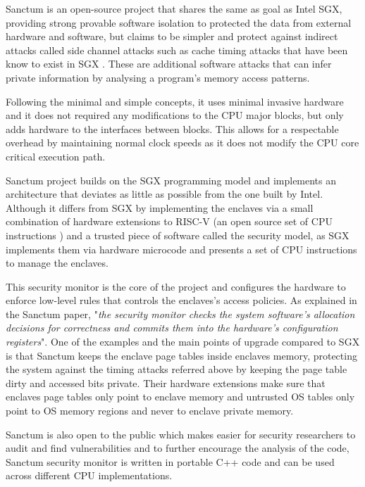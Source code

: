 Sanctum \cite{cryptoeprint:2015:564} is an open-source project that shares the same as goal as Intel \gls{SGX}, providing strong provable software isolation to protected the data from external hardware and software, but claims to be simpler and protect against indirect attacks called side channel attacks \cite{Khan2014} such as cache timing attacks \cite{cachetimingattaks:1} that have been know to exist in \gls{SGX} \cite{Gtzfried2017, 2017arXiv170208719S}. These are additional software attacks that can infer private information by analysing a program’s memory access patterns.

Following the minimal and simple concepts, it uses minimal invasive hardware and it does not required any modifications to the CPU major blocks, but only adds hardware to the interfaces between blocks. This allows for a respectable overhead by maintaining normal clock speeds as it does not modify the CPU core critical execution path.

Sanctum project builds on the \gls{SGX} programming model and implements an architecture that deviates as little as possible from the one built by Intel. Although it differs from \gls{SGX} by implementing the enclaves via a small combination of hardware extensions to RISC-V (an open source set of CPU instructions \cite{Waterman14therisc-v}) and a trusted piece of software called the security model, as SGX implements them via hardware microcode and presents a set of CPU instructions to manage the enclaves.

This security monitor is the core of the project and configures the hardware to enforce low-level rules that controls the enclaves's access policies. As explained in the Sanctum paper, "\textit{the security monitor checks the system software’s allocation decisions for correctness and commits them into the hardware’s configuration registers}". One of the examples and the main points of upgrade compared to \gls{SGX} is that Sanctum keeps the enclave page tables inside enclaves memory, protecting the system against the timing attacks referred above by keeping the page table dirty and accessed bits private. Their hardware extensions make sure that enclaves page tables only point to enclave memory and untrusted \gls{OS} tables only point to \gls{OS} memory regions and never to enclave private memory.

Sanctum is also open to the public which makes easier for security researchers to audit and find vulnerabilities and to further encourage the analysis of the code, Sanctum security monitor is written in portable C++ code and can be used across different CPU implementations.

